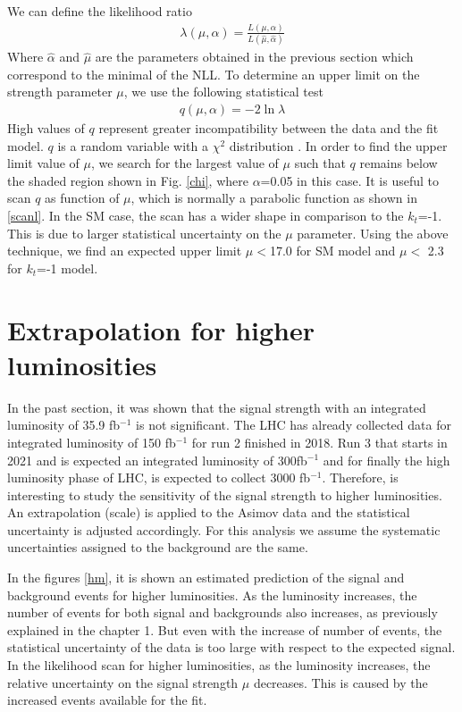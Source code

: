 	We can define the likelihood ratio
	\begin{align}
		\lambda(\mu,\alpha)=\frac{L(\mu,\alpha)}{L(\hat{\mu},\hat{\alpha})}
	\end{align}
	Where $\hat{\alpha}$ and $\hat{\mu}$ are the parameters obtained in the previous section which correspond to the minimal of the NLL.
	To determine an upper limit on the strength parameter $\mu$, we use the following statistical test
	\begin{align}
		q(\mu,\alpha)= -2\ln{\lambda} 
	\end{align}
	High values of $q$ represent greater incompatibility between the data and the fit model.
	$q$ is a random variable with a $\chi^2$ distribution \cite{asimov}.
	In order to find the upper limit value of $\mu$, we search for the largest value of $\mu$ such that $q$ remains below the shaded region shown in Fig. \ref{chi}, where $\alpha$=0.05 in this case. 
	It is useful to scan $q$ as function of $\mu$, which is normally a parabolic function as shown in \ref{scanl}. In the SM case, the scan has a wider shape in comparison to the $k_t$=-1. This is due to larger statistical uncertainty on the $\mu$ parameter. 
	Using the above technique, we find an expected upper limit $\mu < $17.0 for SM model and $\mu < $ 2.3 for $k_t$=-1 model. 
	\pagebreak
	\section{Extrapolation for higher luminosities}
	In the past section, it was shown that the signal strength with an integrated luminosity of 35.9 fb$^{-1}$ is not significant. The LHC has already collected data for integrated luminosity of 150 fb$^{-1}$ for run 2 finished in 2018. Run 3 that starts in 2021 and is expected an integrated luminosity of 300fb$^{-1}$ and for finally the high luminosity phase of LHC, is expected to collect 3000 fb$^{-1}$. Therefore, is interesting to study the sensitivity of the signal strength to higher luminosities. 
	An extrapolation (scale) is applied to the Asimov data and the statistical uncertainty is adjusted accordingly. For this analysis we assume the systematic uncertainties assigned to the background are the same.
	
	In the figures \ref{hm}, it is shown an estimated prediction of the signal and background events for higher luminosities. As the luminosity increases, the number of events for both signal and backgrounds also increases, as previously explained in the chapter 1. But even with the increase of number of events, the statistical uncertainty of the data is too large with respect to the expected signal. In the likelihood scan for higher luminosities, as the luminosity increases, the relative uncertainty on the signal strength $\mu$ decreases. This is caused by the increased events available for the fit. 
	
